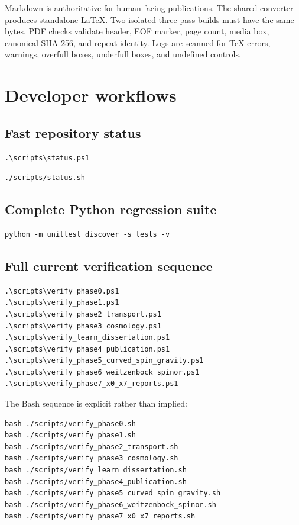 \documentclass[11pt]{article}
\begin{document}
Markdown is authoritative for human-facing publications. The shared converter produces standalone LaTeX. Two isolated three-pass builds must have the same bytes. PDF checks validate header, EOF marker, page count, media box, canonical SHA-256, and repeat identity. Logs are scanned for TeX errors, warnings, overfull boxes, underfull boxes, and undefined controls.

\section{Developer workflows}

\subsection{Fast repository status}

\begin{Verbatim}[fontsize=\small]
.\scripts\status.ps1
\end{Verbatim}

\begin{Verbatim}[fontsize=\small]
./scripts/status.sh
\end{Verbatim}

\subsection{Complete Python regression suite}

\begin{Verbatim}[fontsize=\small]
python -m unittest discover -s tests -v
\end{Verbatim}

\subsection{Full current verification sequence}

\begin{Verbatim}[fontsize=\small]
.\scripts\verify_phase0.ps1
.\scripts\verify_phase1.ps1
.\scripts\verify_phase2_transport.ps1
.\scripts\verify_phase3_cosmology.ps1
.\scripts\verify_learn_dissertation.ps1
.\scripts\verify_phase4_publication.ps1
.\scripts\verify_phase5_curved_spin_gravity.ps1
.\scripts\verify_phase6_weitzenbock_spinor.ps1
.\scripts\verify_phase7_x0_x7_reports.ps1
\end{Verbatim}

The Bash sequence is explicit rather than implied:

\begin{Verbatim}[fontsize=\small]
bash ./scripts/verify_phase0.sh
bash ./scripts/verify_phase1.sh
bash ./scripts/verify_phase2_transport.sh
bash ./scripts/verify_phase3_cosmology.sh
bash ./scripts/verify_learn_dissertation.sh
bash ./scripts/verify_phase4_publication.sh
bash ./scripts/verify_phase5_curved_spin_gravity.sh
bash ./scripts/verify_phase6_weitzenbock_spinor.sh
bash ./scripts/verify_phase7_x0_x7_reports.sh
\end{Verbatim}
\end{document}
